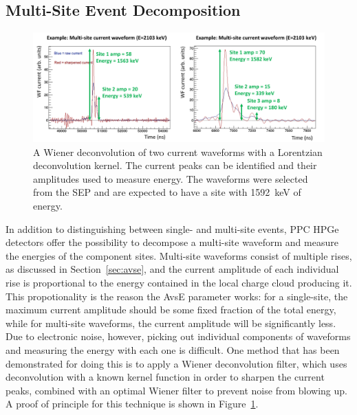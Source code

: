 \documentclass[/main.tex]{subfiles}
\begin{document}
  \subsection{Multi-Site Event Decomposition}
\begin{figure}[h]
  \centering
  \includegraphics[width=\textwidth]{wienercurrent}
  \caption[Proof of principle for multi-site event decomposition]{\label{fig:wienercurrent}
    A Wiener deconvolution of two current waveforms with a Lorentzian deconvolution kernel. The current peaks can be identified and their amplitudes used to measure energy. The waveforms were selected from the SEP and are expected to have a site with 1592~keV of energy.
  }
\end{figure}
In addition to distinguishing between single- and multi-site events, PPC HPGe detectors offer the possibility to decompose a multi-site waveform and measure the energies of the component sites.
Multi-site waveforms consist of multiple rises, as discussed in Section~\ref{sec:avse}, and the current amplitude of each individual rise is proportional to the energy contained in the local charge cloud producing it.
This propotionality is the reason the AvsE parameter works: for a single-site, the maximum current amplitude should be some fixed fraction of the total energy, while for multi-site waveforms, the current amplitude will be significantly less.
Due to electronic noise, however, picking out individual components of waveforms and measuring the energy with each one is difficult.
One method that has been demonstrated for doing this is to apply a Wiener deconvolution filter, which uses deconvolution with a known kernel function in order to sharpen the current peaks, combined with an optimal Wiener filter to prevent noise from blowing up.
A proof of principle for this technique is shown in Figure~\ref{fig:wienercurrent}.
\end{document}
